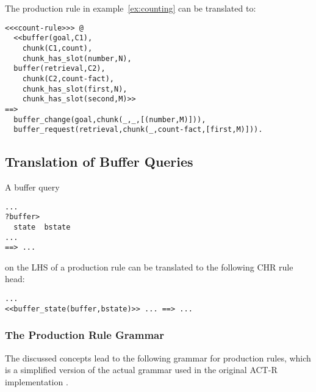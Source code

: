 \begin{example}
The production rule in example~\ref{ex:counting} can be translated to:

\begin{lstlisting}
<<<count-rule>>> @
  <<buffer(goal,C1), 
    chunk(C1,count),
    chunk_has_slot(number,N),
  buffer(retrieval,C2),
    chunk(C2,count-fact),
    chunk_has_slot(first,N),
    chunk_has_slot(second,M)>>
==>
  buffer_change(goal,chunk(_,_,[(number,M)])),
  buffer_request(retrieval,chunk(_,count-fact,[first,M)])).
\end{lstlisting}

\end{example}


\subsection{Translation of Buffer Queries}

A buffer query

\begin{lstlisting}
...
?buffer>
  state  bstate 
...
==> ...
\end{lstlisting}

on the LHS of a production rule can be translated to the following CHR rule head:

\begin{lstlisting}
...
<<buffer_state(buffer,bstate)>> ... ==> ...
\end{lstlisting}

\subsubsection{The Production Rule Grammar}

The discussed concepts lead to the following grammar for production rules, which is a simplified version of the actual grammar used in the original ACT-R implementation \cite[p. 162]{actr_reference}. 


